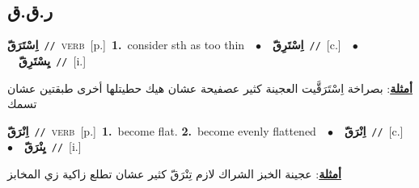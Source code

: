 \documentclass[10pt,a4paper,twoside]{article} %
\begin{document}
\begin{multicols}{2}
\vspace{-3mm}
\subsection*{\color{blue}\foreignlanguage{arabic}{ر.ق.ق}\color{blue}{}} 

{\setlength\topsep{0pt}\textbf{\foreignlanguage{arabic}{اِسْتَرَقّ}}\ {\color{gray}\texttt{//}\color{black}}\ \textsc{verb}\ [p.]\ \textbf{1.}~consider sth as too thin\ \ $\bullet$\ \ \setlength\topsep{0pt}\textbf{\foreignlanguage{arabic}{اِسْتَرِقّ}}\ {\color{gray}\texttt{//}\color{black}}\ [c.]\ \ $\bullet$\ \ \setlength\topsep{0pt}\textbf{\foreignlanguage{arabic}{يِسْتَرِقّ}}\ {\color{gray}\texttt{//}\color{black}}\ [i.]\  \begin{flushright}\color{gray}\foreignlanguage{arabic}{\textbf{\underline{\foreignlanguage{arabic}{أمثلة}}}: بصراخة اِسْتَرَقَّيت العجينة كثير عصفيحة عشان هيك حطيتلها أخرى طبقتين عشان تسمك}\end{flushright}\color{black}} \vspace{2mm}

{\setlength\topsep{0pt}\textbf{\foreignlanguage{arabic}{اِنْرَقّ}}\ {\color{gray}\texttt{//}\color{black}}\ \textsc{verb}\ [p.]\ \textbf{1.}~become flat.  \textbf{2.}~become evenly flattened\ \ $\bullet$\ \ \setlength\topsep{0pt}\textbf{\foreignlanguage{arabic}{اِنْرَقّ}}\ {\color{gray}\texttt{//}\color{black}}\ [c.]\ \ $\bullet$\ \ \setlength\topsep{0pt}\textbf{\foreignlanguage{arabic}{يِنْرَقّ}}\ {\color{gray}\texttt{//}\color{black}}\ [i.]\  \begin{flushright}\color{gray}\foreignlanguage{arabic}{\textbf{\underline{\foreignlanguage{arabic}{أمثلة}}}: عجينة الخبز الشراك لازم تِنْرَقّ كثير عشان تطلع زاكية زي المخابز}\end{flushright}\color{black}} \vspace{2mm}


\end{multicols}
\end{document}
